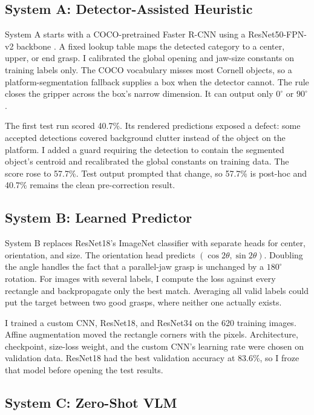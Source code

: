 \documentclass[10pt,conference,compsoc]{IEEEtran}
\begin{document}
\subsection{System A: Detector-Assisted Heuristic}

System A starts with a COCO-pretrained Faster R-CNN using a
ResNet50-FPN-v2 backbone \cite{ren2015}. A fixed lookup table maps the detected
category to a center, upper, or end grasp. I calibrated the global opening and
jaw-size constants on training labels only. The COCO vocabulary misses most
Cornell objects, so a platform-segmentation fallback supplies a box when the
detector cannot. The rule closes the gripper across the box's narrow
dimension. It can output only $0^\circ$ or $90^\circ$.

The first test run scored 40.7\%. Its rendered predictions exposed a defect:
some accepted detections covered background clutter instead of the object on
the platform. I added a guard requiring the detection to contain the
segmented object's centroid and recalibrated the global constants on training
data. The score rose to 57.7\%. Test output prompted that change, so 57.7\%
is post-hoc and 40.7\% remains the clean pre-correction result.

\subsection{System B: Learned Predictor}

System B replaces ResNet18's ImageNet classifier \cite{he2016} with separate
heads for center, orientation, and size. The orientation head predicts
$(\cos 2\theta,\sin 2\theta)$. Doubling the angle handles the fact that a
parallel-jaw grasp is unchanged by a $180^\circ$ rotation. For images with
several labels, I compute the loss against every rectangle and backpropagate
only the best match. Averaging all valid labels could put the target between
two good grasps, where neither one actually exists.

I trained a custom CNN, ResNet18, and ResNet34 on the 620 training images.
Affine augmentation moved the rectangle corners with the pixels. Architecture,
checkpoint, size-loss weight, and the custom CNN's learning rate were chosen
on validation data. ResNet18 had the best validation accuracy at 83.6\%, so I
froze that model before opening the test results.

\subsection{System C: Zero-Shot VLM}
\end{document}
